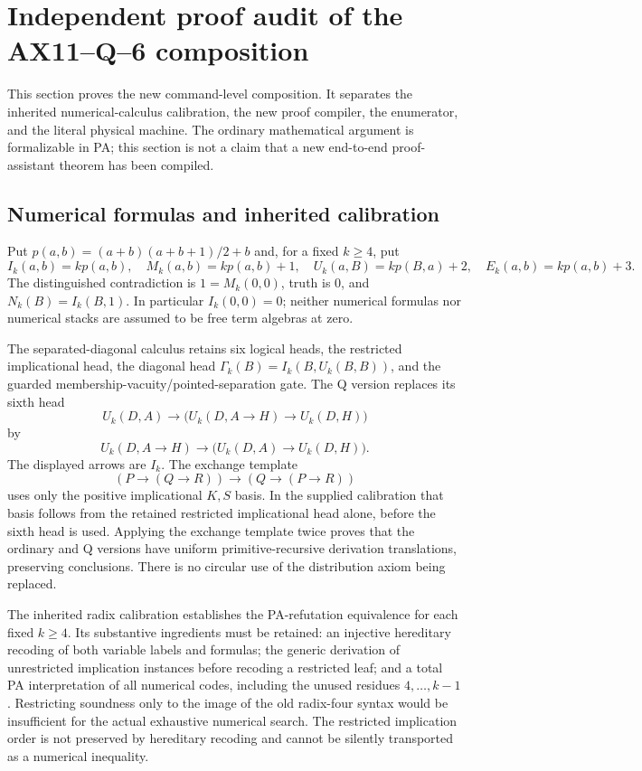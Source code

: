 \section{Independent proof audit of the AX11--Q--6 composition}
\label{sec:ax11q6-audit}

This section proves the new command-level composition.  It separates the
inherited numerical-calculus calibration, the new proof compiler, the
enumerator, and the literal physical machine.  The ordinary mathematical
argument is formalizable in PA; this section is not a claim that a new
end-to-end proof-assistant theorem has been compiled.

\subsection{Numerical formulas and inherited calibration}

Put $p(a,b)=(a+b)(a+b+1)/2+b$ and, for a fixed $k\geq4$, put
\[
 I_k(a,b)=kp(a,b),\quad M_k(a,b)=kp(a,b)+1,\quad
 U_k(a,B)=kp(B,a)+2,\quad E_k(a,b)=kp(a,b)+3.
\]
The distinguished contradiction is $1=M_k(0,0)$, truth is $0$, and
$N_k(B)=I_k(B,1)$.  In particular $I_k(0,0)=0$; neither numerical formulas
nor numerical stacks are assumed to be free term algebras at zero.

The separated-diagonal calculus retains six logical heads, the restricted
implicational head, the diagonal head $\Gamma_k(B)=I_k(B,U_k(B,B))$, and
the guarded membership-vacuity/pointed-separation gate.  The Q version
replaces its sixth head
\[
 U_k(D,A)\to\bigl(U_k(D,A\to H)\to U_k(D,H)\bigr)
\]
by
\[
 U_k(D,A\to H)\to\bigl(U_k(D,A)\to U_k(D,H)\bigr).
\]
The displayed arrows are $I_k$.  The exchange template
\[
 (P\to(Q\to R))\to(Q\to(P\to R))
\]
uses only the positive implicational $K,S$ basis.  In the supplied
calibration that basis follows from the retained restricted implicational
head alone, before the sixth head is used.  Applying the exchange template
twice proves that the ordinary and Q versions have uniform
primitive-recursive derivation translations, preserving conclusions.
There is no circular use of the distribution axiom being replaced.

The inherited radix calibration establishes the PA-refutation equivalence
for each fixed $k\geq4$.  Its substantive ingredients must be retained:
an injective hereditary recoding of both variable labels and formulas;
the generic derivation of unrestricted implication instances before
recoding a restricted leaf; and a total PA interpretation of all numerical
codes, including the unused residues $4,\ldots,k-1$.  Restricting soundness
only to the image of the old radix-four syntax would be insufficient for
the actual exhaustive numerical search.  The restricted implication
order is not preserved by hereditary recoding and cannot be silently
transported as a numerical inequality.

